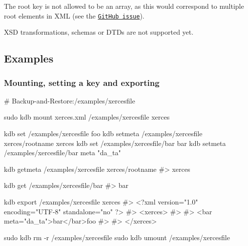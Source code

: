 The root key is not allowed to be an array, as this would correspond to multiple root elements in X\+ML (see the \href{https://github.com/ElektraInitiative/libelektra/issues/1451}{\tt Git\+Hub issue}).

X\+SD transformations, schemas or D\+T\+Ds are not supported yet.

\subsection*{Examples}

\subsubsection*{Mounting, setting a key and exporting}


\begin{DoxyCode}
# Backup-and-Restore:/examples/xercesfile

sudo kdb mount xerces.xml /examples/xercesfile xerces

kdb set /examples/xercesfile foo
kdb setmeta /examples/xercesfile xerces/rootname xerces
kdb set /examples/xercesfile/bar bar
kdb setmeta /examples/xercesfile/bar meta "da\_ta"

kdb getmeta /examples/xercesfile xerces/rootname
#> xerces

kdb get /examples/xercesfile/bar
#> bar

kdb export /examples/xercesfile xerces
#> <?xml version="1.0" encoding="UTF-8" standalone="no" ?>
#> <xerces>
#>
#>   <bar meta="da\_ta">bar</bar>foo
#>
#> </xerces>

sudo kdb rm -r /examples/xercesfile
sudo kdb umount /examples/xercesfile
\end{DoxyCode}
 